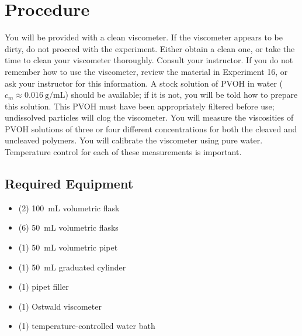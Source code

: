 \documentclass[nobib,nofonts,nols,nohyper]{tufte-handout}
\begin{document}
\section{Procedure} %
\label{sec:procedure}

You will be provided with a clean viscometer. 
If the viscometer appears to be dirty, do not proceed with the experiment. 
Either obtain a clean one, or take the time to clean your viscometer thoroughly. 
Consult your instructor. 
If you do not remember how to use the viscometer, review the material in Experiment 16, or ask your instructor for this information. 
A stock solution of PVOH in water (\( c_m \approx \qty{0.016}{\g \per \mL} \)) should be available; if it is not, you will be told how to prepare this solution. 
This PVOH must have been appropriately filtered before use; undissolved particles will clog the viscometer. 
You will measure the viscosities of PVOH solutions of three or four different concentrations for both the cleaved and uncleaved polymers. 
You will calibrate the viscometer using pure water. 
Temperature control for each of these measurements is important.

\subsection{Required Equipment} %
\label{sub:required_equipment}

\begin{itemize}
	\item (2) \qty{100}{\mL} volumetric flask
	\item (6) \qty{50}{\mL} volumetric flasks
	\item (1) \qty{50}{\mL} volumetric pipet
	\item (1) \qty{50}{\mL} graduated cylinder
	\item (1) pipet filler
	\item (1) Ostwald viscometer
	\item (1) temperature-controlled water bath
\end{itemize}

\end{document}
